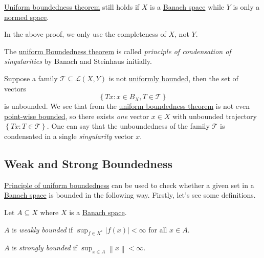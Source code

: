 \begin{remark}[Completeness]
	\hyperref[thm:uniform-boundedness]{Uniform boundedness theorem} still holds if \(X\) is a \hyperref[def:Banach-space]{Banach space} while \(Y\) is only a \hyperref[def:normed-vector-space]{normed space}.
\end{remark}
\begin{explanation}
	In the above proof, we only use the completeness of \(X\), not \(Y\).
\end{explanation}

\begin{note}
	The \hyperref[thm:uniform-boundedness]{uniform Boundedness theorem} is called \emph{principle of condensation of singularities} by Banach and Steinhaus initially.
\end{note}
\begin{explanation}
	Suppose a family \(\mathcal{T} \subseteq \mathcal{L} (X, Y)\) is not \hyperref[def:uniformly-bounded]{uniformly bounded}, then the set of vectors
	\[
		\left\{ Tx\colon x\in B_X, T\in \mathcal{T}  \right\}
	\]
	is unbounded. We see that from the \hyperref[thm:uniform-boundedness]{uniform boundedness theorem} is not even \hyperref[def:point-wise-bounded]{point-wise bounded}, so there exists \emph{one} vector \(x\in X\) with unbounded trajectory \(\left\{ Tx\colon T\in \mathcal{T}  \right\} \). One can say that the unboundedness of the family \(\mathcal{T} \) is condensated in a single \emph{singularity} vector \(x\).
\end{explanation}

\subsection{Weak and Strong Boundedness}
\hyperref[thm:uniform-boundedness]{Principle of uniform boundedness} can be used to check whether a given set in a \hyperref[def:Banach-space]{Banach space} is bounded in the following way. Firstly, let's see some definitions.

\begin{definition*}
	Let \(A \subseteq X\) where \(X\) is a \hyperref[def:Banach-space]{Banach space}.
	\begin{definition}\label{def:weakly-bounded}
		\(A\) is \emph{weakly bounded} if \(\sup _{f\in X^{\ast} }\left\vert f(x) \right\vert < \infty\) for all \(x\in A\).
	\end{definition}
	\begin{definition}\label{def:strongly-bounded}
		\(A\) is \emph{strongly bounded} if \(\sup _{x\in A}\left\lVert x\right\rVert < \infty\).
	\end{definition}
\end{definition*}


